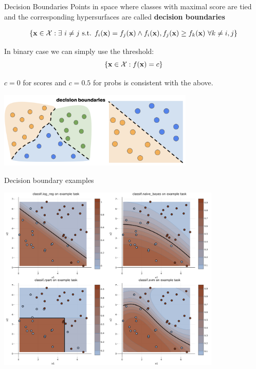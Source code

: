 \documentclass[11pt,compress,t,notes=noshow, xcolor=table]{beamer}
\begin{document}
\begin{vbframe}{Decision Boundaries}
Points in space where classes with maximal score are tied and the corresponding hypersurfaces are called \textbf{decision boundaries}

\begin{eqnarray*}
\{ \xv \in \Xspace: \exists~i \ne j \text{ s.t. } \fkx[i] = \fkx[j] \land \fkx[i], \fkx[j] \ge \fkx[k] ~ \forall k \ne i, j\}
\end{eqnarray*}  
  
In binary case we can simply use the threshold:
$$
    \{ \xv \in \Xspace : \fx = c \}
$$

$c=0$ for scores and $c=0.5$ for probs is consistent with the above.

\begin{center}
  \includegraphics[width=0.7\textwidth]{figure_man/decision_boundaries.png} 
\end{center}

\end{vbframe}


\begin{vbframe}{Decision boundary examples}

{\centering 
\includegraphics[width=0.80\textwidth]{figure/db_examples.png} 
}

\end{vbframe}
\end{document}

